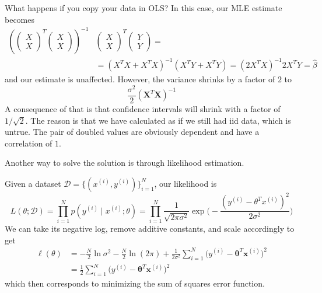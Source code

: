 \documentclass{article}
\begin{document}
    \begin{example}
      What happens if you copy your data in OLS? In this case, our MLE estimate becomes 
      \begin{align*}
          \left(\begin{pmatrix}X \\ X \end{pmatrix}^T \begin{pmatrix} X \\ X \end{pmatrix} \right )^{-1} & \begin{pmatrix} X \\ X  \end{pmatrix}^T \begin{pmatrix} Y \\ Y  \end{pmatrix}  =\\
      & = (X^T X + X^T X)^{-1} (X^T Y + X^T Y ) = (2 X^T X)^{-1} 2 X^T Y = \hat{\beta}
      \end{align*}
      and our estimate is unaffected. However, the variance shrinks by a factor of $2$ to 
      \begin{equation}
        \frac{\sigma^2}{2} (\mathbf{X}^T \mathbf{X})^{-1}
      \end{equation}
      A consequence of that is that confidence intervals will shrink with a factor of $1/\sqrt{2}$. The reason is that we have calculated as if we still had iid data, which is untrue. The pair of doubled values are obviously dependent and have a correlation of $1$. 
    \end{example}

    Another way to solve the solution is through likelihood estimation. 

    \begin{theorem}
      Given a dataset $\mathcal{D} = \{(x^{(i)}, y^{(i)})\}_{i=1}^N$, our likelihood is 
      \[L(\theta ; \mathcal{D}) = \prod_{i=1}^N p(y^{(i)} \mid x^{(i)}; \theta) = \prod_{i=1}^N \frac{1}{\sqrt{2 \pi \sigma^2}} \exp \bigg( -\frac{(y^{(i)} - \theta^T x^{(i)})^2}{2 \sigma^2} \bigg)\]
      We can take its negative log, remove additive constants, and scale accordingly to get 
      \begin{align*}
          \ell (\theta) & = -\frac{N}{2} \ln{\sigma^2} - \frac{N}{2} \ln(2 \pi) + \frac{1}{2 \sigma^2} \sum_{i=1}^N \big(y^{(i)} - \boldsymbol{\theta}^T \mathbf{x}^{(i)} \big)^2 \\
          & =\frac{1}{2} \sum_{i=1}^N \big(y^{(i)} - \boldsymbol{\theta}^T \mathbf{x}^{(i)} \big)^2 
      \end{align*}
      which then corresponds to minimizing the sum of squares error function. 

    \end{theorem}
\end{document}
